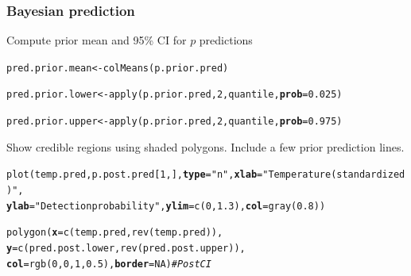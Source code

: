 \documentclass[color=usenames,dvipsnames]{beamer}\usepackage[]{graphicx}\usepackage[]{xcolor}
\makeatletter
\newcommand{\hlnum}[1]{\textcolor[rgb]{0.69,0.494,0}{#1}}%
\newcommand{\hlsng}[1]{\textcolor[rgb]{0.749,0.012,0.012}{#1}}%
\newcommand{\hlcom}[1]{\textcolor[rgb]{0.514,0.506,0.514}{\textit{#1}}}%
\newcommand{\hldef}[1]{\textcolor[rgb]{0,0,0}{#1}}%
\newcommand{\hlkwb}[1]{\textcolor[rgb]{0,0.341,0.682}{#1}}%
\newcommand{\hlkwc}[1]{\textcolor[rgb]{0,0,0}{\textbf{#1}}}%
\newcommand{\hlkwd}[1]{\textcolor[rgb]{0.004,0.004,0.506}{#1}}%
\newenvironment{kframe}{%
 \def\at@end@of@kframe{}%
 \ifinner\ifhmode%
  \def\at@end@of@kframe{\end{minipage}}%
  \begin{minipage}{\columnwidth}%
 \fi\fi%
 \def\FrameCommand##1{\hskip\@totalleftmargin \hskip-\fboxsep
 \colorbox{shadecolor}{##1}\hskip-\fboxsep
     \hskip-\linewidth \hskip-\@totalleftmargin \hskip\columnwidth}%
 \MakeFramed {\advance\hsize-\width
   \@totalleftmargin\z@ \linewidth\hsize
   \@setminipage}}%
 {\par\unskip\endMakeFramed%
 \at@end@of@kframe}
\newenvironment{knitrout}{}{} %
\makeatother
\begin{document}
\begin{frame}[fragile]
  \frametitle{Bayesian prediction}
  Compute prior mean and 95\% CI for $p$ predictions
\begin{knitrout}\scriptsize
{}\color{fgcolor}\begin{kframe}
\begin{alltt}
\hldef{pred.prior.mean} \hlkwb{<-} \hlkwd{colMeans}\hldef{(p.prior.pred)}
\end{alltt}


{\ttfamily\noindent\bfseries\color{errorcolor}{\#\# Error: object 'p.prior.pred' not found}}\begin{alltt}
\hldef{pred.prior.lower} \hlkwb{<-} \hlkwd{apply}\hldef{(p.prior.pred,} \hlnum{2}\hldef{, quantile,} \hlkwc{prob}\hldef{=}\hlnum{0.025}\hldef{)}
\end{alltt}


{\ttfamily\noindent\bfseries\color{errorcolor}{\#\# Error: object 'p.prior.pred' not found}}\begin{alltt}
\hldef{pred.prior.upper} \hlkwb{<-} \hlkwd{apply}\hldef{(p.prior.pred,} \hlnum{2}\hldef{, quantile,} \hlkwc{prob}\hldef{=}\hlnum{0.975}\hldef{)}
\end{alltt}


{\ttfamily\noindent\bfseries\color{errorcolor}{\#\# Error: object 'p.prior.pred' not found}}\end{kframe}
\end{knitrout}
  \pause
  \vfill
  Show credible regions using shaded polygons. Include a few prior prediction lines.
\begin{knitrout}\scriptsize
{}\color{fgcolor}\begin{kframe}
\begin{alltt}
\hlkwd{plot}\hldef{(temp.pred, p.post.pred[}\hlnum{1}\hldef{,],} \hlkwc{type}\hldef{=}\hlsng{"n"}\hldef{,} \hlkwc{xlab}\hldef{=}\hlsng{"Temperature (standardized)"}\hldef{,}
     \hlkwc{ylab}\hldef{=}\hlsng{"Detection probability"}\hldef{,} \hlkwc{ylim}\hldef{=}\hlkwd{c}\hldef{(}\hlnum{0}\hldef{,} \hlnum{1.3}\hldef{),} \hlkwc{col}\hldef{=}\hlkwd{gray}\hldef{(}\hlnum{0.8}\hldef{))}
\end{alltt}


{\ttfamily\noindent\bfseries\color{errorcolor}{\#\# Error in h(simpleError(msg, call)): error in evaluating the argument 'y' in selecting a method for function 'plot': object 'p.post.pred' not found}}\begin{alltt}
\hlkwd{polygon}\hldef{(}\hlkwc{x}\hldef{=}\hlkwd{c}\hldef{(temp.pred,} \hlkwd{rev}\hldef{(temp.pred)),}
        \hlkwc{y}\hldef{=}\hlkwd{c}\hldef{(pred.post.lower,} \hlkwd{rev}\hldef{(pred.post.upper)),}
        \hlkwc{col}\hldef{=}\hlkwd{rgb}\hldef{(}\hlnum{0}\hldef{,}\hlnum{0}\hldef{,}\hlnum{1}\hldef{,}\hlnum{0.5}\hldef{),} \hlkwc{border}\hldef{=}\hlnum{NA}\hldef{)}                   \hlcom{# Post CI}
\end{alltt}



\end{kframe}
\end{knitrout}
\end{frame}
\end{document}
